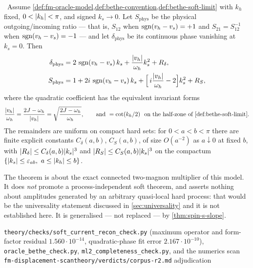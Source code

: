 \begin{theorem}
\label{thm:two-body-soft}
\statusProved\ Assume \cref{def:fm-oracle-model,def:bethe-convention,def:bethe-soft-limit}
with $k_h$ fixed, $0<\lvert k_h\rvert<\pi$, and signed $k_s\to0$. Let
$S_{\mathrm{phys}}$ be the physical outgoing/incoming ratio --- that is,
$S_{12}$ when $\operatorname{sgn}(v_h-v_s)=+1$ and $S_{21}=S_{12}^{-1}$ when
$\operatorname{sgn}(v_h-v_s)=-1$ --- and let $\delta_{\mathrm{phys}}$ be its continuous
phase vanishing at $k_s=0$. Then
\begin{align}
  \delta_{\mathrm{phys}}
    &=2\,\operatorname{sgn}(v_h-v_s)\,k_s+\frac{\lvert v_h\rvert}{\omega_h}k_s^2+R_\delta,
    \label{eq:delta-phys}\\
  S_{\mathrm{phys}}
    &=1+2i\,\operatorname{sgn}(v_h-v_s)\,k_s
      +\Bigl[\,i\frac{\lvert v_h\rvert}{\omega_h}-2\Bigr]k_s^2+R_S ,
    \label{eq:S-phys}
\end{align}
where the quadratic coefficient has the equivalent invariant forms
\begin{equation}
  \frac{\abs{v_h}}{\omega_h}=\frac{2J-\omega_h}{\abs{v_h}}
  =\sqrt{\frac{2J-\omega_h}{\omega_h}},
  \qquad\text{and }=\cot(k_h/2)\ \text{ on the half-zone of \cref{def:bethe-soft-limit}.}
\end{equation}
The remainders are uniform on compact hard sets: for $0<a<b<\pi$ there are
finite explicit constants $C_\delta(a,b)$, $C_S(a,b)$, of size $O(a^{-2})$ as
$a\downarrow0$ at fixed $b$, with
$\lvert R_\delta\rvert\le C_\delta(a,b)\lvert k_s\rvert^3$ and
$\lvert R_S\rvert\le C_S(a,b)\lvert k_s\rvert^3$ on the compactum
$\{\abs{k_s}\le\varepsilon_{ab},\ a\le\abs{k_h}\le b\}$.
\end{theorem}
\begin{scope}
The theorem is about the exact connected two-magnon multiplier of this model.
It does \emph{not} promote a process-independent soft theorem, and asserts
nothing about amplitudes generated by an arbitrary quasi-local hard process:
that would be the universality statement discussed in \cref{sec:universality}
and it is not established here. It is generalised --- not replaced --- by
\cref{thm:spin-s-slope}.
\end{scope}
%
{\texttt{theory/checks/soft\_current\_recon\_check.py} (maximum operator and
form-factor residual $1.560\cdot10^{-14}$, quadratic-phase fit error
$2.167\cdot10^{-10}$), \texttt{oracle\_bethe\_check.py},
\texttt{ml2\_completeness\_check.py}, and the numerics scan
\texttt{fm-displacement-scan}}{\texttt{theory/verdicts/corpus-r2.md}
adjudication}

